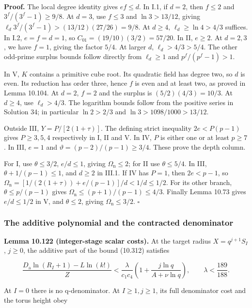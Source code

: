 \documentclass[
  11pt,
  a4paper,
]{article}
\begin{document}
\textbf{Proof.} The local degree identity gives \(ef\le d\). In I.1, if
\(d=2\), then \(f\le2\) and \(3^f/(3^f-1)\ge9/8\). At \(d=3\), use
\(f\le3\) and \(\ln3>13/12\), giving
\(\ell_d3^f/(3^f-1)>(13/12)(27/26)=9/8\). At \(d\ge4\),
\(\ell_d\ge\ln4>4/3\) suffices. In I.2, \(e=f=d=1\), so
\(C_{01}=(19/10)(3/2)=57/20\). In II, \(e\ge2\). At \(d=2,3\), we have
\(f=1\), giving the factor \(5/4\). At larger \(d\), \(\ell_d>4/3>5/4\).
The other odd-prime surplus bounds follow directly from \(\ell_d\ge1\)
and \(p^f/(p^f-1)>1\).

In V, \(K\) contains a primitive cube root. Its quadratic field has
degree two, so \(d\) is even. Its reduction has order three, hence \(f\)
is even and at least two, as proved in Lemma 10.104. At \(d=2\), \(f=2\)
and the surplus is \((5/2)(4/3)=10/3\). At \(d\ge4\), use
\(\ell_d>4/3\). The logarithm bounds follow from the positive series in
Solution 34; in particular \(\ln2>2/3\) and \(\ln3>1098/1000>13/12\).

Outside III, \(Y=P/[2(1+\tau)]\). The defining strict inequality
\(2e<P(p-1)\) gives \(P\ge3,5,4\) respectively in I, II and V. In IV,
\(P\) is either one or at least \(p\ge7\). In III, \(e=1\) and
\(\vartheta=(p-2)/(p-1)\ge3/4\). These prove the depth column.

For I, use \(\theta\le3/2\), \(e/d\le1\), giving
\(\Omega_{\mathrm n}\le2\); for II use \(\theta\le5/4\). In III,
\(\theta+1/(p-1)\le1\), and \(d\ge2\) in III.1. If IV has \(P=1\), then
\(2e<p-1\), so
\(\Omega_{\mathrm n}=[1/(2(1+\tau))+e/(p-1)]/d<1/d\le1/2\). For its
other branch, \(\theta\le p/(p-1)\) gives
\(\Omega_{\mathrm n}\le(p+1)/(p-1)\le4/3\). Finally Lemma 10.73 gives
\(e/d\le1/2\) in V, and \(\theta\le2\), giving
\(\Omega_{\mathrm n}\le3/2\). \(\square\)

\subsubsection{The additive polynomial and the contracted
denominator}\label{the-additive-polynomial-and-the-contracted-denominator}

\textbf{Lemma 10.122 (integer-stage scalar costs).} At the target radius
\(X=q^{j+1}S_I\), \(j\ge0\), the additive part of the bound (10.312)
satisfies

\[
\frac{D_{\mathrm a}\ln(R_I+1)-L\ln(k!)}Z
<\frac{\lambda}{c_1c_4}
\left(1+\frac{j\ln q}{A+\nu\ln q}\right),
\qquad \lambda<\frac{189}{188}.
\tag{10.325}
\]

At \(I=0\) there is no q-denominator. At \(I\ge1,j\ge1\), its full
denominator cost and the torus height obey
\end{document}
